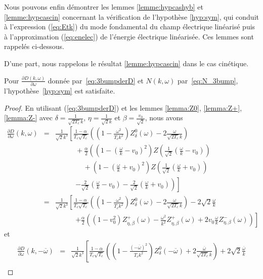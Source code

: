 Nous pouvons enfin démontrer les lemmes \ref{lemme:hypcashyb} et \ref{lemme:hypcascin} concernant la vérification de l'hypothèse \ref{hyp:sym}, qui conduit à l'expression (\ref{eq:Etk}) du mode fondamental du champ électrique linéarisé puis à l'approximation (\ref{eq:enelec}) de l'énergie électrique linéarisée. Ces lemmes sont rappelés ci-dessous.

D'une part, nous rappelons le résultat \ref{lemme:hypcascin} dans le cas cinétique.
\begin{lemma}
  Pour $\frac{\partial D(k,\omega)}{\partial\omega}$ donnée par~\eqref{eq:3bumpderD} et $N(k,\omega)$ par~\eqref{eq:N_3bump}, l'hypothèse~\ref{hyp:sym} est satisfaite.
\end{lemma}

\begin{proof}
En utilisant (\ref{eq:3bumpderD}) et les lemmes \ref{lemma:Z0}, \ref{lemma:Z+}, \ref{lemma:Z-} avec $\delta=\frac{1}{\sqrt{2T_c}k}$, $\eta=\frac{1}{\sqrt{2}k}$ et $\beta=\frac{v_0}{\sqrt{2}}$, nous avons
\begin{eqnarray*}
\frac{\partial D}{\partial \omega}(k,\omega)&=&\frac{1}{\sqrt{2}k^3}\left[\frac{1-\alpha}{T_c\sqrt{T_c}}\left(\left(1-\frac{\omega^2}{T_ck^2}\right)Z_\delta^0\left(\omega\right)-2\frac{\omega}{\sqrt{2T_c}k}\right)\right.\nonumber\\
&&~~~~~~~~~~~~~+\frac{\alpha}{2}\left(\left(1-\left(\frac{\omega}{k}-v_0\right)^2\right)Z\left(\frac{1}{\sqrt{2}}\left(\frac{\omega}{k}-v_0\right)\right)\right.\nonumber\\
&&~~~~~~~~~~~~~~~~~~+\left.\left.\left(1-\left(\frac{\omega}{k}+v_0\right)^2\right)Z\left(\frac{1}{\sqrt{2}}\left(\frac{\omega}{k}+v_0\right)\right)\right.\right.\nonumber\\
&&~~~~~~~~~~~~~\left.\left.-\frac{2}{\sqrt{2}}\left(\frac{\omega}{k}-v_0\right)-\frac{2}{\sqrt{2}}\left(\frac{\omega}{k}+v_0\right)\right)\right]\nonumber\\
&=&\frac{1}{\sqrt{2}k^3}\left[\frac{1-\alpha}{T_c\sqrt{T_c}}\left(\left(1-\frac{\omega^2}{T_ck^2}\right)Z_\delta^0\left(\omega\right)-2\frac{\omega}{\sqrt{2T_c}k}\right)-2\sqrt{2}\frac{\omega}{k}\right.\nonumber\\
&&~~~~~~~~~~~~~\left.+\frac{\alpha}{2}\left((1-v_0^2)Z_{\eta,\beta}^+\left(\omega\right)-\frac{\omega^2}{k^2}Z_{\eta,\beta}^+\left(\omega\right)+2v_0\frac{\omega}{k}Z_{\eta,\beta}^-\left(\omega\right)\right)\right]
\end{eqnarray*}
et
\begin{eqnarray*}
\frac{\partial D}{\partial \omega}(k,-\overline{\omega})&=&\frac{1}{\sqrt{2}k^3}\left[\frac{1-\alpha}{T_c\sqrt{T_c}}\left(\left(1-\frac{(-\overline{\omega})^2}{T_ck^2}\right)Z_\delta^0\left(-\overline{\omega}\right)+2\frac{\overline{\omega}}{\sqrt{2T_c}k}\right)+2\sqrt{2}\frac{\overline{\omega}}{k}\right.\nonumber\\

\end{eqnarray*}
\end{proof}
